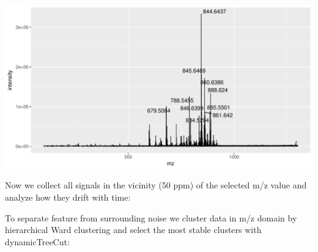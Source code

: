 \documentclass[]{article}
\newenvironment{Shaded}{\begin{snugshade}}{\end{snugshade}}
\newcommand{\KeywordTok}[1]{\textcolor[rgb]{0.13,0.29,0.53}{\textbf{#1}}}
\newcommand{\FloatTok}[1]{\textcolor[rgb]{0.00,0.00,0.81}{#1}}
\newcommand{\StringTok}[1]{\textcolor[rgb]{0.31,0.60,0.02}{#1}}
\newcommand{\OperatorTok}[1]{\textcolor[rgb]{0.81,0.36,0.00}{\textbf{#1}}}
\newcommand{\NormalTok}[1]{#1}
\begin{document}
\includegraphics{Supplementary_document_files/figure-latex/ion.plots.600-1.pdf}

Now we collect all signals in the vicinity (50 ppm) of the selected m/z
value and analyze how they drift with time:

\begin{Shaded}
\end{Shaded}

To separate feature from surrounding noise we cluster data in m/z domain
by hierarchical Ward clustering and select the most stable clusters with
dynamicTreeCut:
\end{document}
